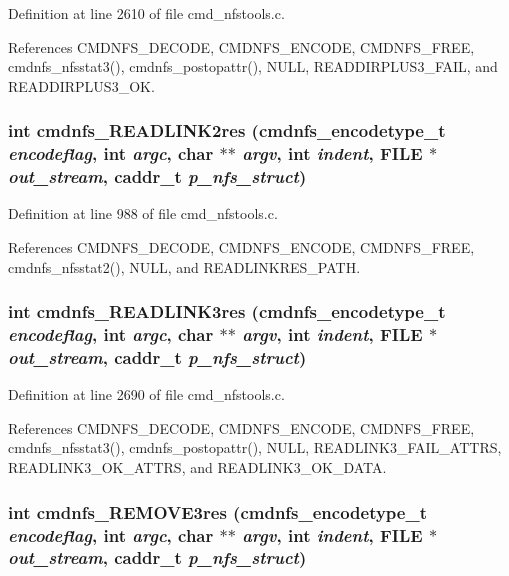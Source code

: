 Definition at line 2610 of file cmd\_\-nfstools.c.

References CMDNFS\_\-DECODE, CMDNFS\_\-ENCODE, CMDNFS\_\-FREE, cmdnfs\_\-nfsstat3(), cmdnfs\_\-postopattr(), NULL, READDIRPLUS3\_\-FAIL, and READDIRPLUS3\_\-OK.
\subsubsection{\setlength{\rightskip}{0pt plus 5cm}int cmdnfs\_\-READLINK2res ({\bf cmdnfs\_\-encodetype\_\-t} {\em encodeflag}, int {\em argc}, char $\ast$$\ast$ {\em argv}, int {\em indent}, FILE $\ast$ {\em out\_\-stream}, caddr\_\-t {\em p\_\-nfs\_\-struct})}\label{cmd__nfstools_8c_a73}




Definition at line 988 of file cmd\_\-nfstools.c.

References CMDNFS\_\-DECODE, CMDNFS\_\-ENCODE, CMDNFS\_\-FREE, cmdnfs\_\-nfsstat2(), NULL, and READLINKRES\_\-PATH.
\subsubsection{\setlength{\rightskip}{0pt plus 5cm}int cmdnfs\_\-READLINK3res ({\bf cmdnfs\_\-encodetype\_\-t} {\em encodeflag}, int {\em argc}, char $\ast$$\ast$ {\em argv}, int {\em indent}, FILE $\ast$ {\em out\_\-stream}, caddr\_\-t {\em p\_\-nfs\_\-struct})}\label{cmd__nfstools_8c_a96}




Definition at line 2690 of file cmd\_\-nfstools.c.

References CMDNFS\_\-DECODE, CMDNFS\_\-ENCODE, CMDNFS\_\-FREE, cmdnfs\_\-nfsstat3(), cmdnfs\_\-postopattr(), NULL, READLINK3\_\-FAIL\_\-ATTRS, READLINK3\_\-OK\_\-ATTRS, and READLINK3\_\-OK\_\-DATA.
\subsubsection{\setlength{\rightskip}{0pt plus 5cm}int cmdnfs\_\-REMOVE3res ({\bf cmdnfs\_\-encodetype\_\-t} {\em encodeflag}, int {\em argc}, char $\ast$$\ast$ {\em argv}, int {\em indent}, FILE $\ast$ {\em out\_\-stream}, caddr\_\-t {\em p\_\-nfs\_\-struct})}\label{cmd__nfstools_8c_a106}




